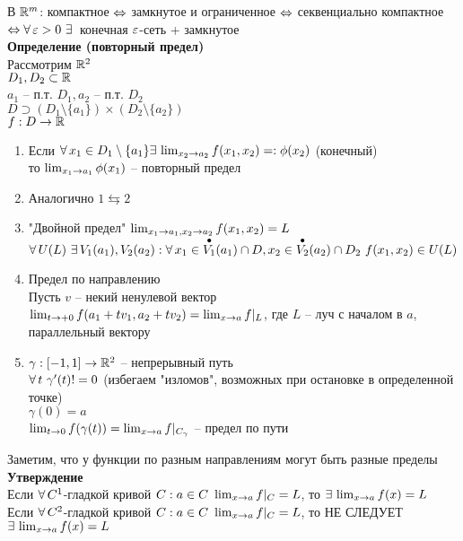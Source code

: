 \documentclass[12pt]{article}
\begin{document}
В $\mathbb{R}^m$: компактное $\Leftrightarrow$ замкнутое и ограниченное $\Leftrightarrow$ секвенциально компактное $\Leftrightarrow \forall\, \varepsilon > 0\ \exists\,$ конечная $\varepsilon$-сеть + замкнутое\\
\textbf{Определение (повторный предел)}\\
Рассмотрим $\mathbb{R}^2$\\
$D_1, D_2 \subset \mathbb{R}$\\
$a_1$ -- п.т. $D_1, a_2$ -- п.т. $D_2$\\
$D \supset (D_1 \setminus \{a_1\}) \times (D_2 \setminus \{a_2\})$\\
$f: D \rightarrow \mathbb{R}$\\
\begin{enumerate}
    \item Если $\forall\, x_1 \in D_1 \setminus \{a_1\} \exists\, \lim_{x_2\rightarrow a_2} f(x_1, x_2) =: \phi(x_2)$ (конечный)\\
    то $\lim_{x_1 \rightarrow a_1} \phi(x_1)$ -- повторный предел
    \item Аналогично $1 \leftrightarrows 2$\\
    \item "Двойной предел" $\lim_{x_1 \rightarrow a_1, x_2 \rightarrow a_2} f(x_1, x_2) = L$
    $\forall\, U(L)\ \exists\, V_1(a_1), V_2(a_2): \forall\, x_1 \in \overset{\bullet}{V_1}(a_1) \cap D, x_2 \in \overset{\bullet}{V_2}(a_2) \cap D_2\ f(x_1, x_2) \in U(L)$
    \item Предел по направлению\\
    Пусть $v$ -- некий ненулевой вектор\\
    $\lim_{t\rightarrow +0} f(a_1 + tv_1, a_2 + tv_2) = \lim_{x\rightarrow a} f|_L$, где $L$ -- луч с началом в $a$, параллельный вектору
    \item $\gamma: [-1, 1] \rightarrow \mathbb{R}^2$ -- непрерывный путь\\
    $\forall\, t\ \gamma'(t) != 0$ (избегаем "изломов", возможных при остановке в определенной точке)\\
    $\gamma(0) = a$\\
    $\lim_{t\rightarrow 0} f(\gamma(t)) = \lim_{x\rightarrow a} f|_{C_\gamma}$ -- предел по пути
\end{enumerate}
Заметим, что у функции по разным направлениям могут быть разные пределы\\
\textbf{Утверждение}\\
Если $\forall\, C^1$-гладкой кривой $C: a \in C\ \lim_{x\rightarrow a}f|_C = L$, то $\exists\, \lim_{x\rightarrow a} f(x) = L$\\
Если $\forall\, C^2$-гладкой кривой $C: a \in C\ \lim_{x\rightarrow a}f|_C = L$, то НЕ СЛЕДУЕТ $\exists\, \lim_{x\rightarrow a} f(x) = L$\\
\end{document}
